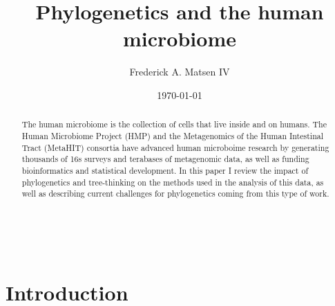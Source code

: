 \documentclass{amsart}
\newcommand{\forarxiv}[1]{#1}
\newcommand{\notforarxiv}[1]{}
\begin{document}
\notforarxiv{
\begin{flushright}
Version dated: \today
\end{flushright}
\bigskip
\noindent RH: PHYLOGENETICS AND THE HUMAN MICROBIOME
\bigskip
\medskip
\begin{center}

\noindent{\Large \bf Phylogenetics and the human microbiome}
\bigskip

\noindent {\normalsize \sc
Frederick A. Matsen IV$^1$}\\
\noindent {\small \it
$^1$
Program in Computational Biology, Fred Hutchinson Cancer Research Center, Seattle, WA, 91802, USA}\\
\end{center}
\medskip
\noindent{\bf Corresponding author:} Frederick A Matsen, Program in Computational Biology, Fred Hutchinson Cancer Research Center, Seattle, WA, 91802, USA; E-mail: matsen@fhcrc.org.\\
\vspace{1in}
}

\forarxiv{\
\title{Phylogenetics and the human microbiome}
\author{Frederick A. Matsen IV}
\date{\today}
\begin{abstract}
}
\notforarxiv{
\subsubsection{Abstract}
}

The human microbiome is the collection of cells that live inside and on humans.
The Human Microbiome Project (HMP) and the Metagenomics of the Human Intestinal Tract (MetaHIT) consortia have advanced human microboime research by generating thousands of 16s surveys and terabases of metagenomic data, as well as funding bioinformatics and statistical development.
In this paper I review the impact of phylogenetics and tree-thinking on the methods used in the analysis of this data, as well as describing current challenges for phylogenetics coming from this type of work.

\forarxiv{
\end{abstract}
\maketitle

\section{Introduction}
}
\end{document}
